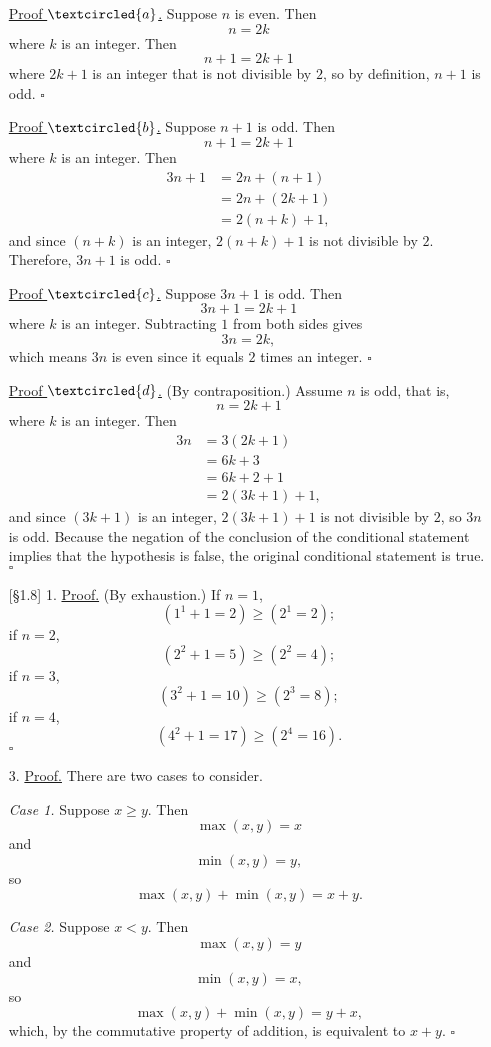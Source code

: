 \documentclass{article}
\begin{document}
\begin{enumerate}
    \underline{Proof $\textcircled{a}$.} Suppose $n$ is even. Then
    \[
    n = 2k
    \]
    where $k$ is an integer. Then
    \[
    n+1 = 2k+1
    \]
    where $2k+1$ is an integer that is not divisible by $2$, so by definition, $n+1$ is odd. $\square$

    \underline{Proof $\textcircled{b}$.} Suppose $n+1$ is odd. Then
    \[
    n+1 = 2k+1
    \]
    where $k$ is an integer. Then
    \begin{align*}
    3n+1 &= 2n + (n+1) \\
    &= 2n + (2k+1)\\
    &= 2(n+k) + 1,
    \end{align*}
    and since $(n+k)$ is an integer, $2(n+k) + 1$ is not divisible by $2$. Therefore, $3n+1$ is odd. $\square$

    \underline{Proof $\textcircled{c}$.} Suppose $3n+1$ is odd. Then
    \[
    3n+1 = 2k+1
    \]
    where $k$ is an integer. Subtracting $1$ from both sides gives
    \[
    3n = 2k,
    \]
    which means $3n$ is even since it equals $2$ times an integer. $\square$

    \underline{Proof $\textcircled{d}$.} (By contraposition.) Assume $n$ is odd, that is,
    \[
    n = 2k+1
    \]
    where $k$ is an integer. Then
    \begin{align*}
    3n &= 3(2k+1)\\
    &= 6k+3 \\
    &= 6k+2+1 \\
    &= 2(3k+1)+1,
    \end{align*}
    and since $(3k+1)$ is an integer, $2(3k+1)+1$ is not divisible by $2$, so $3n$ is odd. Because the negation of the conclusion of the conditional statement implies that the hypothesis is false, the original conditional statement is true. $\square$
    \item[{[\S 1.8]} 1.] \underline{Proof.} (By exhaustion.) If $n=1$,
    \[
    (1^1 + 1 = 2) \ge (2^1 = 2);
    \]
    if $n=2$,
    \[
    (2^2 + 1 = 5) \ge (2^2 = 4);
    \]
    if $n=3$,
    \[
    (3^2 + 1 = 10) \ge (2^3 = 8);
    \]
    if $n=4$,
    \[
    (4^2 + 1 = 17) \ge (2^4 = 16).
    \]
    $\square$
    \item[3.] \underline{Proof.} There are two cases to consider.

    \emph{Case 1.} Suppose $x \ge y$. Then
    \[
    \max(x,y) = x
    \]
    and
    \[
    \min(x,y) = y,
    \]
    so
    \[
    \max(x,y) + \min(x,y) = x+y.
    \]

    \emph{Case 2.} Suppose $x < y$. Then
    \[
    \max(x,y) = y
    \]
    and
    \[
    \min(x,y) = x,
    \]
    so
    \[
    \max(x,y) + \min(x,y) = y+x,
    \]
    which, by the commutative property of addition, is equivalent to $x+y$. $\square$
\end{enumerate}
\end{document}
